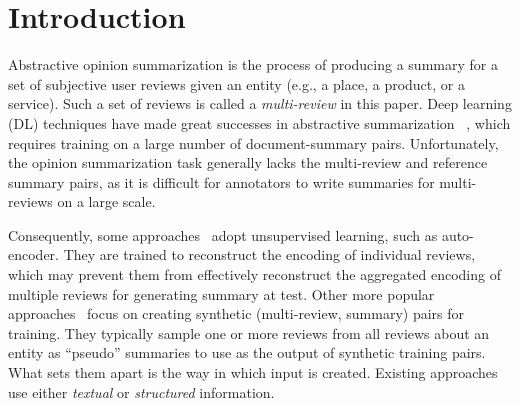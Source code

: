 \section{Introduction}
\label{sec:intro}


Abstractive opinion summarization is the process of 
producing a summary for a set of 
subjective user reviews given an entity 
(e.g., a place, a product, or a service). 
Such a set of reviews is called a {\em multi-review} in this paper. 
Deep learning (DL) techniques have made great successes 
in abstractive summarization
~\cite{NallapatiZSGX16,SeeLM17,LiuLZ18,CelikyilmazBHC18,BART20}, 
which requires training on a large number of document-summary pairs.
Unfortunately, the opinion summarization task 
generally lacks the multi-review and reference summary pairs,
as it is difficult for annotators to write summaries for 
multi-reviews on a large scale.


Consequently, some approaches~\cite{MeanSum19,Copycat20,tree21}
adopt unsupervised learning, such as auto-encoder.
They are trained to reconstruct the encoding of individual reviews, which may prevent them from effectively reconstruct the aggregated encoding of multiple reviews for generating summary at test.
Other more popular approaches~\cite{Denoise20,Fewshot20,Plansum20,transsum21} 
focus on creating synthetic (multi-review, summary) pairs for training.
They typically sample one or more reviews from all reviews about an entity
as ``pseudo'' summaries to use as the output of synthetic training pairs.
What sets them apart is the way in which input is created.
Existing approaches use either {\em textual} or  {\em structured} information.

